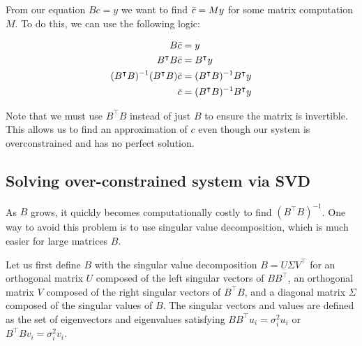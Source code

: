 \documentclass{article}%
\begin{document}
From our equation $Bc=y$ we want to find $\Bar{c}=My$ for some matrix computation $M$. To do this, we can use the following logic:

\begin{align*}
    B\Bar{c} &= y\\
    B^\intercal B\Bar{c} &= B^\intercal y\\
    (B^\intercal B)^{-1} (B^\intercal B) \Bar{c} &= (B^\intercal B)^{-1} B^\intercal y\\
    \Bar{c} &= (B^\intercal B)^{-1} B^\intercal y
\end{align*}

Note that we must use $B^\intercal B$ instead of just $B$ to ensure the matrix is invertible. This allows us to find an approximation of $c$ even though our system is overconstrained and has no perfect solution.

\subsection{Solving over-constrained system via SVD}


As $B$ grows, it quickly becomes computationally costly to find $(B^\intercal B)^{-1}$. One way to avoid this problem is to use singular value decomposition, which is much easier for large matrices $B$.

Let us first define $B$ with the singular value decomposition $B=U\Sigma V^\intercal$ for an orthogonal matrix $U$ composed of the left singular vectors of $BB^\intercal$, an orthogonal matrix $V$ composed of the right singular vectors of $B^\intercal B$, and a diagonal matrix $\Sigma$ composed of the singular values of $B$.
The singular vectors and values are defined as the set of eigenvectors and eigenvalues satisfying $BB^\intercal u_i = \sigma^2_i u_i$ or $B^\intercal B v_i = \sigma^2_i v_i$.
\end{document}

